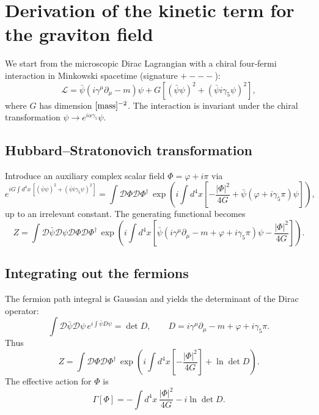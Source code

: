 \documentclass[11pt]{article}
\begin{document}
\section*{Derivation of the kinetic term for the graviton field}

We start from the microscopic Dirac Lagrangian with a chiral four‑fermi interaction in Minkowski spacetime (signature \(+---\)):
\begin{equation}\label{eq:Lag}
\mathcal{L} = \bar{\psi}(i\gamma^\mu\partial_\mu - m)\psi + G\left[(\bar{\psi}\psi)^2 + (\bar{\psi}i\gamma_5\psi)^2\right],
\end{equation}
where \(G\) has dimension \([{\rm mass}]^{-2}\). The interaction is invariant under the chiral transformation \(\psi \to e^{i\alpha\gamma_5}\psi\).

\subsection*{Hubbard–Stratonovich transformation}
Introduce an auxiliary complex scalar field \(\Phi = \varphi + i\pi\) via
\begin{equation}
e^{iG\int d^4x\,[(\bar{\psi}\psi)^2+(\bar{\psi}i\gamma_5\psi)^2]} = \int\mathcal{D}\Phi\mathcal{D}\Phi^\dagger\,
\exp\!\left(i\int d^4x\left[-\frac{|\Phi|^2}{4G} + \bar{\psi}(\varphi + i\gamma_5\pi)\psi\right]\right),
\end{equation}
up to an irrelevant constant. The generating functional becomes
\begin{equation}
Z = \int\mathcal{D}\bar{\psi}\mathcal{D}\psi\mathcal{D}\Phi\mathcal{D}\Phi^\dagger\,
\exp\!\left(i\int d^4x\left[\bar{\psi}(i\gamma^\mu\partial_\mu - m + \varphi + i\gamma_5\pi)\psi - \frac{|\Phi|^2}{4G}\right]\right).
\end{equation}

\subsection*{Integrating out the fermions}
The fermion path integral is Gaussian and yields the determinant of the Dirac operator:
\begin{equation}
\int\mathcal{D}\bar{\psi}\mathcal{D}\psi\, e^{i\int\bar{\psi}D\psi} = \det D,\qquad
D = i\gamma^\mu\partial_\mu - m + \varphi + i\gamma_5\pi.
\end{equation}
Thus
\begin{equation}
Z = \int\mathcal{D}\Phi\mathcal{D}\Phi^\dagger\, \exp\!\left(i\int d^4x\left[-\frac{|\Phi|^2}{4G}\right] + \ln\det D\right).
\end{equation}
The effective action for \(\Phi\) is
\begin{equation}\label{eq:Gamma}
\Gamma[\Phi] = -\int d^4x\,\frac{|\Phi|^2}{4G} - i\ln\det D.
\end{equation}
\end{document}
